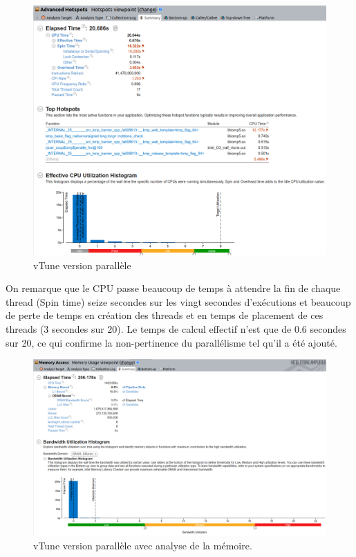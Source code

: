 \documentclass[
 aip,
 jmp,
 amsmath,amssymb,
 reprint
]{revtex4-1}
\begin{document}
\begin{figure}[H]
  \includegraphics[width=\linewidth, keepaspectratio=true]{vtune_parallel.png}
  \centering
  \caption{vTune version parallèle\label{Fig:vtune_proc_use}}
\end{figure}

On remarque que le CPU passe beaucoup de temps à attendre la fin de chaque thread (Spin time) seize secondes sur les vingt secondes d'exécutions et beaucoup de perte de temps en création des threads et en temps de placement de ces threads (3 secondes sur 20). Le temps de calcul effectif n'est que de 0.6 secondes sur 20, ce qui confirme la non-pertinence du parallélisme tel qu'il a été ajouté.

\begin{figure}[H]
  \includegraphics[width=\linewidth, keepaspectratio=true]{vtune_parallel_memory.png}
  \centering
  \caption{vTune version parallèle avec analyse de la mémoire.\label{Fig:vtune_mem_use}}
\end{figure}
\end{document}
